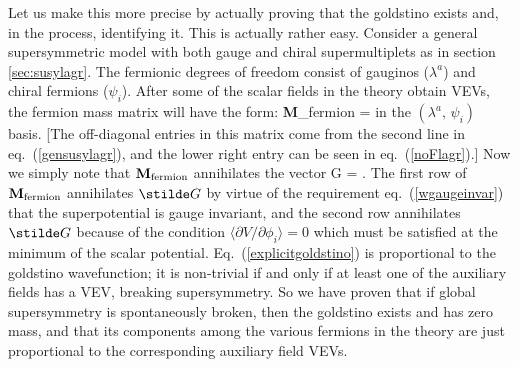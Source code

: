 Let us make this more precise by actually proving that the goldstino
exists and, in the process, identifying it. This is actually rather easy.
Consider a general
supersymmetric model 
with both
gauge and chiral supermultiplets
as in section \ref{sec:susylagr}. 
The fermionic degrees of freedom
consist of gauginos ($\lambda^a$) and chiral fermions
($\psi_i$).
After some of the scalar fields in the theory obtain VEVs, the
fermion mass matrix will have the form:
\beq
{\bf M}_{\rm fermion} =
\eeq
in the $(\lambda^a,\,\psi_i)$ basis. [The off-diagonal entries in this
matrix come from the second line in eq.~(\ref{gensusylagr}), and the 
lower right entry can be seen in eq.~(\ref{noFlagr}).] Now we simply note
that ${\bf M}_{\rm fermion}$ annihilates the vector 
\beq
{\stilde G} = 
.
\label{explicitgoldstino}
\eeq
The first row of ${\bf M}_{\rm fermion}$
annihilates $\stilde G$ by virtue of the requirement 
eq.~(\ref{wgaugeinvar}) that the
superpotential is gauge invariant, and the
second row annihilates $\stilde G$ because of the condition
$
\langle {\partial V/ \partial \phi_i} \rangle = 0
$
which must be satisfied at the minimum of the scalar potential.
Eq.~(\ref{explicitgoldstino}) is proportional to the goldstino
wavefunction; it
is non-trivial
if and only if at least one of the auxiliary fields has a VEV, breaking
supersymmetry.
So we have proven that if global supersymmetry is spontaneously broken,
then the goldstino exists and has zero mass, and that its components among
the
various fermions in the theory are just proportional to the corresponding
auxiliary field VEVs.


